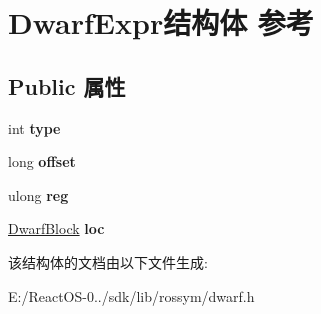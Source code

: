 \hypertarget{struct_dwarf_expr}{}\section{Dwarf\+Expr结构体 参考}
\label{struct_dwarf_expr}
\subsection*{Public 属性}
\begin{DoxyCompactItemize}
\item 
\mbox{\label{struct_dwarf_expr_a13de67ebce168140570cfba692a98c45}} 
int {\bfseries type}
\item 
\mbox{\label{struct_dwarf_expr_ad594997d6ea30ad5332b2285f930ee15}} 
long {\bfseries offset}
\item 
\mbox{\label{struct_dwarf_expr_a3acd7ce683cd559781c8a900b97d89e6}} 
ulong {\bfseries reg}
\item 
\mbox{\label{struct_dwarf_expr_ac7b3959808a826f121d4347c88f8f2da}} 
\hyperlink{struct_dwarf_block}{Dwarf\+Block} {\bfseries loc}
\end{DoxyCompactItemize}


该结构体的文档由以下文件生成\+:\begin{DoxyCompactItemize}
\item 
E\+:/\+React\+O\+S-\/0../sdk/lib/rossym/dwarf.\+h\end{DoxyCompactItemize}

